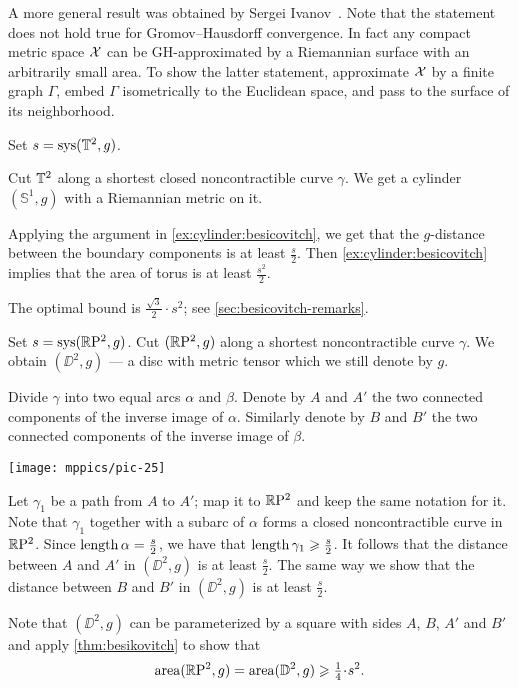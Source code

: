 A more general result was obtained by Sergei Ivanov~\cite{ivanov-1997}.
Note that the statement does not hold true for Gromov--Hausdorff convergence.
In fact any compact metric space $\mathcal{X}$ can be GH-approximated by a Riemannian surface with an arbitrarily small area.
To show the latter statement, approximate $\mathcal{X}$ by a finite graph $\Gamma$, embed $\Gamma$ isometrically to the Euclidean space, and pass to the surface of its neighborhood.

Set $s=\mathop{\rm sys}\nolimits(\mathbb{T}^2,g)$.

Cut $\mathbb{T}^2$ along a shortest closed noncontractible curve $\gamma$.
We get a cylinder $(\mathbb{S}^1,g)$ with a Riemannian metric on it.

Applying the argument in \ref{ex:cylinder:besicovitch}, we get that the $g$-distance between the boundary components is at least $\tfrac s2$.
Then \ref{ex:cylinder:besicovitch} implies that the area of torus is at least $\tfrac{s^2}2$.

The optimal bound is $\tfrac{\sqrt{3}}{2}\cdot s^2$; see  \ref{sec:besicovitch-remarks}.



Set $s\z=\sys (\RP^2,g)$.
Cut $(\mathbb{R}\mathrm{P}^2,g)$ along a shortest noncontractible curve $\gamma$.
We obtain $(\DD^2,g)$ --- a disc with metric tensor which we still denote by $g$.

Divide $\gamma$ into two equal arcs $\alpha$ and $\beta$.
Denote by $A$ and $A'$ the two connected components of the inverse image of $\alpha$.
Similarly denote by $B$ and $B'$ the two connected components of the inverse image of $\beta$.

\begin{Figure}
\vskip-0mm
\centering
\texttt{[image: mppics/pic-25]}
\end{Figure}

Let $\gamma_1$ be a path from $A$ to $A'$;
map it to $\mathbb{R}\mathrm{P}^2$ and keep the same notation for it.
Note that $\gamma_1$ together with a subarc of $\alpha$ forms a closed noncontractible curve in $\mathbb{R}\mathrm{P}^2$.
Since $\mathop{\rm length}\nolimits\alpha=\tfrac s2$, we have that $\mathop{\rm length}\nolimits\gamma_1\geqslant \tfrac s2$.
It follows that the distance between $A$ and $A'$ in $(\DD^2,g)$ is at least $\tfrac s2$.
The same way we show that the distance between $B$ and $B'$ in $(\DD^2,g)$ is at least $\tfrac s2$.

Note that $(\DD^2,g)$ can be parameterized by a square with sides $A$, $B$, $A'$ and $B'$ and apply \ref{thm:besikovitch} to show that 
\[\area(\RP^2,g)=\area(\DD^2,g)\ge \tfrac14\cdot s^2.\]

